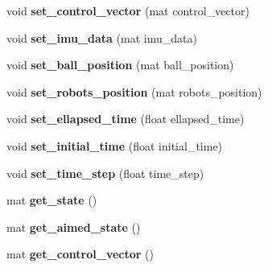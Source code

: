 \begin{DoxyCompactItemize}
\item 
\mbox{\label{class_robot_navigation_ae54d2f6b649c0517b7101322cc69214e}} 
void {\bfseries set\+\_\+control\+\_\+vector} (mat control\+\_\+vector)
\item 
\mbox{\label{class_robot_navigation_a51abc98954d87d9ddb5555985b907483}} 
void {\bfseries set\+\_\+imu\+\_\+data} (mat imu\+\_\+data)
\item 
\mbox{\label{class_robot_navigation_a8884b31179a43f86dc31fc65a9c95e3f}} 
void {\bfseries set\+\_\+ball\+\_\+position} (mat ball\+\_\+position)
\item 
\mbox{\label{class_robot_navigation_add5c64467da4ca8774dd867247ee7733}} 
void {\bfseries set\+\_\+robots\+\_\+position} (mat robots\+\_\+position)
\item 
\mbox{\label{class_robot_navigation_acad092d28f0af0069de026b6e9459e45}} 
void {\bfseries set\+\_\+ellapsed\+\_\+time} (float ellapsed\+\_\+time)
\item 
\mbox{\label{class_robot_navigation_ad4127e6135f10fefffd0524e5cf224e3}} 
void {\bfseries set\+\_\+initial\+\_\+time} (float initial\+\_\+time)
\item 
\mbox{\label{class_robot_navigation_a5f47abc9fd8fe81c2d4df33cd732a84a}} 
void {\bfseries set\+\_\+time\+\_\+step} (float time\+\_\+step)
\item 
\mbox{\label{class_robot_navigation_a3ecd5c2f6f316b4b41b48cb0c28a944e}} 
mat {\bfseries get\+\_\+state} ()
\item 
\mbox{\label{class_robot_navigation_aa56d5bc1153358167a4ea2521050a0b9}} 
mat {\bfseries get\+\_\+aimed\+\_\+state} ()
\item 
\mbox{\label{class_robot_navigation_a825a8172dc71450817593b0dcd6c6dc2}} 
mat {\bfseries get\+\_\+control\+\_\+vector} ()
\item 
\mbox{\label{class_robot_navigation_ab04ff3cecd3441e13588f1a2c78f4e2c}} 

\end{DoxyCompactItemize}

